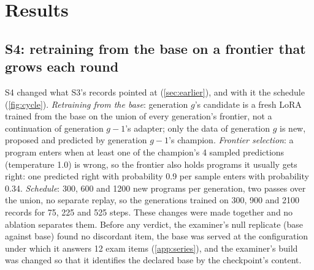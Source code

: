 
\section{Results}\label{sec:rsi}

\subsection{S4: retraining from the base on a frontier that grows each round}\label{sec:rsi4}

S4 changed what S3's records pointed at (\cref{sec:earlier}), and with it the schedule
(\cref{fig:cycle}). \emph{Retraining from the base}: generation $g$'s candidate is a fresh LoRA trained
from the base on the union of every generation's frontier, not a continuation of generation $g-1$'s
adapter; only the data of generation $g$ is new, proposed and predicted by generation $g-1$'s
champion. \emph{Frontier selection}: a program enters when at least one of the champion's 4 sampled
predictions (temperature 1.0) is wrong, so the frontier also holds programs it usually gets right: one
predicted right with probability 0.9 per sample enters with probability 0.34.
\emph{Schedule}: 300, 600 and 1200 new programs per generation, two passes over the union, no separate
replay, so the generations trained on 300, 900 and 2100 records for 75, 225 and 525 steps.
These changes were made together and no ablation separates them. Before any verdict, the examiner's
null replicate (base against base) found no discordant item, the base was served at the configuration
under which it answers 12 exam items (\cref{app:series}), and the examiner's build was changed so that
it identifies the declared base by the checkpoint's content.

\begin{table}[tbp]
\centering\small
\setlength{\tabcolsep}{3.4pt}

\caption{S3 and S4 as the examiner decided them: items right of 889 and each step's wins/losses
with the exact one-sided sign test (a step holds at $p<0.05$ with wins above losses; the criterion is
3 of 4 lineages holding at every step). Pooled rows sum the lineage rows (they equal the plan verdict's) and are descriptive, without a test, because the lineages share the exam's items. $^\dagger$~r2 is compared on the 888 items left after one overlapping item was excluded; at generation~3 it answered 242 of the 889 before the exclusion. S4 trained on \mRsiFourDevRZeroGOneTrainedRecords{}, \mRsiFourDevRZeroGTwoTrainedRecords{} and \mRsiFourDevRZeroGThreeTrainedRecords{} cumulative records at generations 1 to 3. S3's base was served under a different configuration from S4's (\cref{app:series}), so compare steps, not levels.}\label{tab:rsi}
\end{table}

